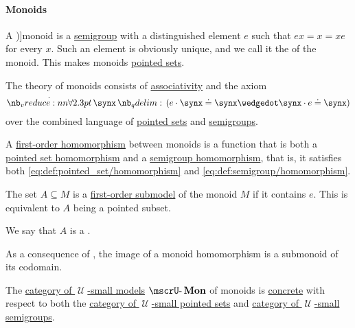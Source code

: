 \paragraph{Monoids}

\begin{definition}\label{def:monoid}
  A \term[ru=моноид (\cite[94]{Мальцев1970АлгебраическиеСистемы})]{monoid} is a \hyperref[def:semigroup]{semigroup} with a distinguished element \( e \) such that \( ex = x = xe \) for every \( x \). Such an element is obviously unique, and we call it the  of the monoid. This makes monoids \hyperref[def:pointed_set]{pointed sets}.

  \begin{thmenum}
    \mimprovised The theory of monoids consists of \hyperref[eq:def:binary_operation/associative]{associativity} and the axiom
    \begin{equation}\label{eq:def:monoid/theory/neutral}
      \qforall \synx (e \cdot \synx \syneq \synx \synwedge \synx \cdot e \syneq \synx)
    \end{equation}
    over the combined language of \hyperref[def:pointed_set/theory]{pointed sets} and \hyperref[def:semigroup/theory]{semigroups}.

     A \hyperref[def:first_order_homomorphism]{first-order homomorphism} between monoids is a function that is both a \hyperref[def:pointed_set/homomorphism]{pointed set homomorphism} and a \hyperref[def:semigroup/homomorphism]{semigroup homomorphism}, that is, it satisfies both \eqref{eq:def:pointed_set/homomorphism} and \eqref{eq:def:semigroup/homomorphism}.

     The set \( A \subseteq M \) is a \hyperref[def:first_order_submodel]{first-order submodel} of the monoid \( M \) if it contains \( e \). This is equivalent to \( A \) being a pointed subset.

    We say that \( A \) is a .

    As a consequence of , the image of a monoid homomorphism is a submonoid of its codomain.

     The \hyperref[def:category_of_small_first_order_models]{category of \( \mscrU \)-small models} \( \ucat{Mon} \) of monoids is \hyperref[def:concrete_category]{concrete} with respect to both the \hyperref[def:pointed_set/category]{category of \( \mscrU \)-small pointed sets} and \hyperref[def:semigroup/category]{category of \( \mscrU \)-small semigroups}.


\end{thmenum}
\end{definition}
